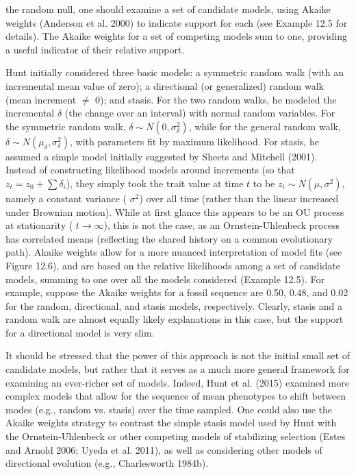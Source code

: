 \documentclass{article}
\begin{document}
the random null, one should examine a set of candidate models, using Akaike weights (Anderson et al. 2000) to indicate support for each (see Example 12.5 for details). The Akaike weights for a set of competing models sum to one, providing a useful indicator of their relative support.

Hunt initially considered three basic models: a symmetric random walk (with an incremental mean value of zero); a directional (or generalized) random walk (mean increment  $ \neq $ 0); and stasis. For the two random walks, he modeled the incremental  $ \delta $ (the change over an interval) with normal random variables. For the symmetric random walk,  $ \delta \sim N(0, \sigma_{\delta}^{2}) $, while for the general random walk,  $ \delta \sim N(\mu_{\delta}, \sigma_{\delta}^{2}) $, with parameters fit by maximum likelihood. For stasis, he assumed a simple model initially suggested by Sheets and Mitchell (2001). Instead of constructing likelihood models around increments (so that  $ z_{t} = z_{0} + \sum \delta_{i} $), they simply took the trait value at time  $ t $ to be  $ z_{t} \sim N(\mu, \sigma^{2}) $, namely a constant variance ( $ \sigma^{2} $) over all time (rather than the linear increased under Brownian motion). While at first glance this appears to be an OU process at stationarity ( $ t \to \infty $), this is not the case, as an Ornstein-Uhlenbeck process has correlated means (reflecting the shared history on a common evolutionary path). Akaike weights allow for a more nuanced interpretation of model fits (see Figure 12.6), and are based on the relative likelihoods among a set of candidate models, summing to one over all the models considered (Example 12.5). For example, suppose the Akaike weights for a fossil sequence are 0.50, 0.48, and 0.02 for the random, directional, and stasis models, respectively. Clearly, stasis and a random walk are almost equally likely explanations in this case, but the support for a directional model is very slim.

It should be stressed that the power of this approach is not the initial small set of candidate models, but rather that it serves as a much more general framework for examining an ever-richer set of models. Indeed, Hunt et al. (2015) examined more complex models that allow for the sequence of mean phenotypes to shift between modes (e.g., random vs. stasis) over the time sampled. One could also use the Akaike weights strategy to contrast the simple stasis model used by Hunt with the Ornstein-Uhlenbeck or other competing models of stabilizing selection (Estes and Arnold 2006; Uyeda et al. 2011), as well as considering other models of directional evolution (e.g., Charlesworth 1984b).
\end{document}
